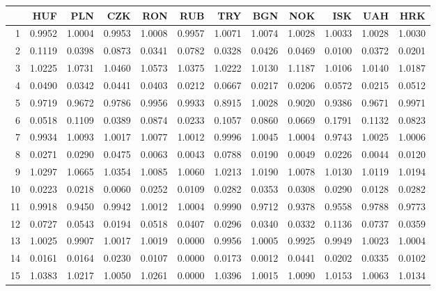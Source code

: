 \documentclass[12pt, a4paper, oneside]{article} %
\begin{document}
\begin{landscape}
\begin{table}[ht]
\centering
\begin{tabular}{rrrrrrrrrrrr}
  \hline
 & HUF & PLN & CZK & RON & RUB & TRY & BGN & NOK & ISK & UAH & HRK \\ 
  \hline
1 & 0.9952 & 1.0004 & 0.9953 & 1.0008 & 0.9957 & 1.0071 & 1.0074 & 1.0028 & 1.0033 & 1.0028 & 1.0030 \\ 
  2 & 0.1119 & 0.0398 & 0.0873 & 0.0341 & 0.0782 & 0.0328 & 0.0426 & 0.0469 & 0.0100 & 0.0372 & 0.0201 \\ 
  3 & 1.0225 & 1.0731 & 1.0460 & 1.0573 & 1.0375 & 1.0222 & 1.0130 & 1.1187 & 1.0106 & 1.0140 & 1.0187 \\ 
  4 & 0.0490 & 0.0342 & 0.0441 & 0.0403 & 0.0212 & 0.0667 & 0.0217 & 0.0206 & 0.0572 & 0.0215 & 0.0512 \\ 
  5 & 0.9719 & 0.9672 & 0.9786 & 0.9956 & 0.9933 & 0.8915 & 1.0028 & 0.9020 & 0.9386 & 0.9671 & 0.9971 \\ 
  6 & 0.0518 & 0.1109 & 0.0389 & 0.0874 & 0.0233 & 0.1057 & 0.0860 & 0.0669 & 0.1791 & 0.1132 & 0.0823 \\ 
  7 & 0.9934 & 1.0093 & 1.0017 & 1.0077 & 1.0012 & 0.9996 & 1.0045 & 1.0004 & 0.9743 & 1.0025 & 1.0006 \\ 
  8 & 0.0271 & 0.0290 & 0.0475 & 0.0063 & 0.0043 & 0.0788 & 0.0190 & 0.0049 & 0.0226 & 0.0044 & 0.0120 \\ 
  9 & 1.0297 & 1.0665 & 1.0354 & 1.0085 & 1.0060 & 1.0213 & 1.0190 & 1.0078 & 1.0130 & 1.0119 & 1.0194 \\ 
  10 & 0.0223 & 0.0218 & 0.0060 & 0.0252 & 0.0109 & 0.0282 & 0.0353 & 0.0308 & 0.0290 & 0.0128 & 0.0282 \\ 
  11 & 0.9918 & 0.9450 & 0.9942 & 1.0012 & 1.0004 & 0.9990 & 0.9712 & 0.9378 & 0.9558 & 0.9788 & 0.9773 \\ 
  12 & 0.0727 & 0.0543 & 0.0194 & 0.0518 & 0.0407 & 0.0296 & 0.0340 & 0.0332 & 0.1136 & 0.0737 & 0.0359 \\ 
  13 & 1.0025 & 0.9907 & 1.0017 & 1.0019 & 0.0000 & 0.9956 & 1.0005 & 0.9925 & 0.9949 & 1.0023 & 1.0004 \\ 
  14 & 0.0161 & 0.0164 & 0.0230 & 0.0107 & 0.0000 & 0.0173 & 0.0012 & 0.0441 & 0.0202 & 0.0335 & 0.0102 \\ 
  15 & 1.0383 & 1.0217 & 1.0050 & 1.0261 & 0.0000 & 1.0396 & 1.0015 & 1.0090 & 1.0153 & 1.0063 & 1.0134 \\ 

\end{tabular}
\end{table}
\end{landscape}
\end{document}
